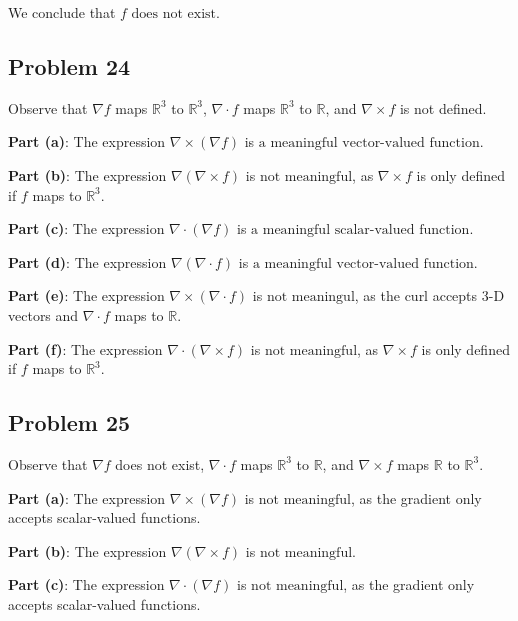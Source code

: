 \documentclass[11pt]{article}
\renewcommand{\grad}{\nabla}
\begin{document}
We conclude that $\boxed{\text{$f$ does not exist}}$.


\subsection*{Problem 24}

Observe that $\grad f$ maps $\mathbb{R}^{3}$ to $\mathbb{R}^{3}$, $\grad \cdot f$ maps $\mathbb{R}^{3}$ to $\mathbb{R}$, and $\grad \times f$ is not defined.

\textbf{Part (a)}: The expression $\grad \times (\grad f)$ is $\boxed{\text{a meaningful vector-valued function}}$.

\textbf{Part (b)}: The expression $\grad (\grad \times f)$ is $\boxed{\text{not meaningful}}$, as $\grad \times f$ is only defined if $f$ maps to $\mathbb{R}^{3}$.

\textbf{Part (c)}: The expression $\grad \cdot (\grad f)$ is $\boxed{\text{a meaningful scalar-valued function}}$.

\textbf{Part (d)}: The expression $\grad (\grad \cdot f)$ is $\boxed{\text{a meaningful vector-valued function}}$. 

\textbf{Part (e)}: The expression $\grad \times (\grad \cdot f)$ is $\boxed{\text{not meaningul}}$, as the curl accepts 3-D vectors and $\grad \cdot f$ maps to $\mathbb{R}$.

\textbf{Part (f)}: The expression $\grad \cdot (\grad \times f)$ is $\boxed{\text{not meaningful}}$, as $\grad \times f$ is only defined if $f$ maps to $\mathbb{R}^{3}$.


\subsection*{Problem 25}

Observe that $\grad f$ does not exist, $\grad \cdot f$ maps $\mathbb{R}^{3}$ to $\mathbb{R}$, and $\grad \times f$ maps $\mathbb{R}$ to $\mathbb{R}^{3}$.

\textbf{Part (a)}: The expression $\grad \times (\grad f)$ is $\boxed{\text{not meaningful}}$, as the gradient only accepts scalar-valued functions.

\textbf{Part (b)}: The expression $\grad (\grad \times f)$ is $\boxed{\text{not meaningful}}$.

\textbf{Part (c)}: The expression $\grad \cdot (\grad f)$ is $\boxed{\text{not meaningful}}$, as the gradient only accepts scalar-valued functions.
\end{document}
